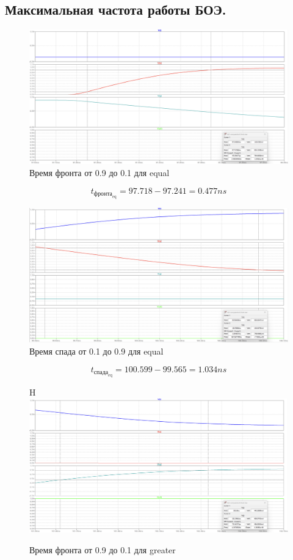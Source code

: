 \documentclass[12pt,onecolumn]{article}
\begin{document}
\subsection{Максимальная частота работы БОЭ.}
\begin{figure}[H]
    \centering
    \includegraphics[width=\textwidth]{image/full-cmp-eq-freq-01.png}
    \caption{Время фронта от 0.9 до 0.1 для equal}
\end{figure}
$$ t_{\text{фронта}_{\text{eq}}}=97.718 - 97.241 = 0.477 ns$$
\begin{figure}[H]
    \centering
    \includegraphics[width=\textwidth]{image/full-cmp-eq-freq-10.png}
    \caption{Время спада от 0.1 до 0.9 для equal}
\end{figure}
$$ t_{\text{спада}_{\text{eq}}}=100.599 - 99.565 = 1.034 ns$$
\begin{figure}{H}
    \centering
    \includegraphics[width=\textwidth]{image/full-cmp-gt-freq-01.png}
    \caption{Время фронта от 0.9 до 0.1 для greater}
\end{figure}
\end{document}
